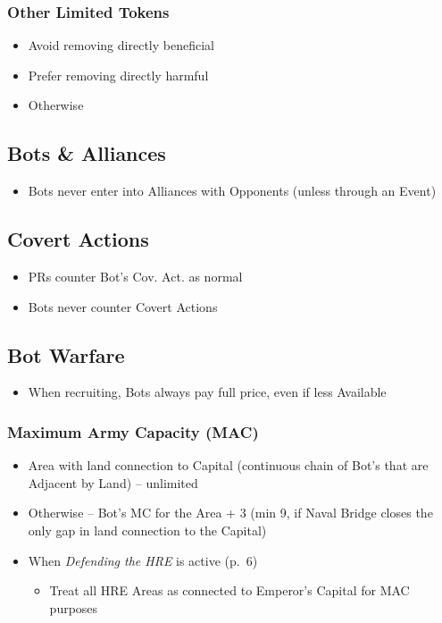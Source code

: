 \documentclass[10pt]{article}
\begin{document}
\subsubsection*{Other Limited Tokens}
\begin{itemize}
	\item Avoid removing directly beneficial
	\item Prefer removing directly harmful
	\item Otherwise \az
\end{itemize}

\subsection*{Bots \& Alliances}
\begin{itemize}
	\item Bots never enter into Alliances with Opponents (unless through an Event)
\end{itemize}

\subsection*{Covert Actions}
\begin{itemize}
	\item PRs counter Bot's Cov. Act. as normal
	\item Bots never counter Covert Actions 
\end{itemize}

\subsection*{Bot Warfare }
\begin{itemize}
	\item When recruiting, Bots always pay full \botpower price, even if less Available \manpower
\end{itemize}

\subsubsection*{Maximum Army Capacity (MAC)}
\begin{itemize}
	\item Area with land connection to Capital (continuous chain of Bot's \towns that are Adjacent by Land) -- unlimited
	\item Otherwise -- Bot's MC for the Area + 3 (min 9, if Naval Bridge closes the only gap in land connection to the Capital)
	\item When \emph{Defending the HRE} is active (p.~6)
	\begin{itemize}
		\item Treat all HRE Areas as connected to Emperor's Capital for MAC purposes
	\end{itemize}
\end{itemize}
\end{document}
